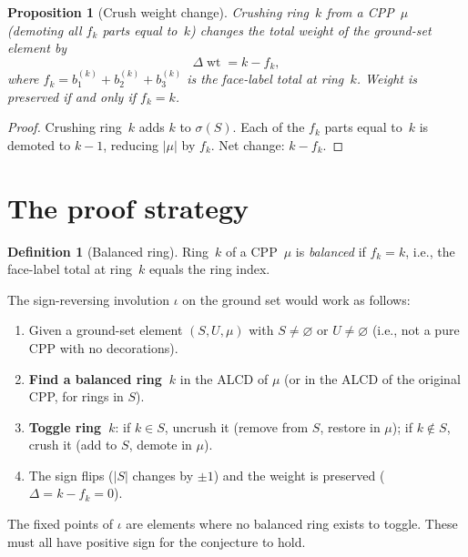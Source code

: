\documentclass[11pt]{article}
\DeclareMathOperator{\wt}{wt}
\theoremstyle{plain}
\newtheorem{proposition}[theorem]{Proposition}
\theoremstyle{definition}
\newtheorem{definition}[theorem]{Definition}
\begin{document}
\begin{proposition}[Crush weight change]
\label{prop:crush}
Crushing ring~$k$ from a CPP~$\mu$ (demoting all $f_k$
parts equal to~$k$) changes the total weight of the
ground-set element by
\[
  \Delta\wt = k - f_k,
\]
where $f_k = b_1^{(k)} + b_2^{(k)} + b_3^{(k)}$ is the
face-label total at ring~$k$.  Weight is preserved if and
only if $f_k = k$.
\end{proposition}

\begin{proof}
Crushing ring~$k$ adds $k$ to $\sigma(S)$.  Each of the
$f_k$ parts equal to~$k$ is demoted to $k-1$, reducing
$|\mu|$ by $f_k$.  Net change: $k - f_k$.
\end{proof}


\section{The proof strategy}

\begin{definition}[Balanced ring]
Ring~$k$ of a CPP~$\mu$ is \emph{balanced} if $f_k = k$,
i.e., the face-label total at ring~$k$ equals the ring
index.
\end{definition}

The sign-reversing involution $\iota$ on the ground set
would work as follows:

\begin{enumerate}
  \item Given a ground-set element $(S, U, \mu)$ with
    $S \neq \varnothing$ or $U \neq \varnothing$
    (i.e., not a pure CPP with no decorations).
  \item \textbf{Find a balanced ring~$k$} in the ALCD
    of $\mu$ (or in the ALCD of the original CPP, for
    rings in $S$).
  \item \textbf{Toggle ring~$k$}: if $k \in S$, uncrush it
    (remove from $S$, restore in $\mu$); if $k \notin S$,
    crush it (add to $S$, demote in $\mu$).
  \item The sign flips ($|S|$ changes by $\pm 1$) and the
    weight is preserved ($\Delta = k - f_k = 0$).
\end{enumerate}

The fixed points of $\iota$ are elements where no
balanced ring exists to toggle.  These must all have
positive sign for the conjecture to hold.
\end{document}
